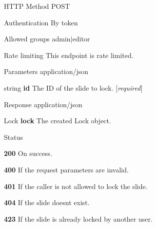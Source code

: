 \begin{DoxyParagraph}{H\+T\+TP Method}
P\+O\+ST 
\end{DoxyParagraph}
\begin{DoxyParagraph}{Authentication}
By token 
\end{DoxyParagraph}
\begin{DoxyParagraph}{Allowed groups}
{\ttfamily admin$\vert$editor} 
\end{DoxyParagraph}
\begin{DoxyParagraph}{Rate limiting}
This endpoint is rate limited.
\end{DoxyParagraph}
\begin{DoxyParagraph}{Parameters}
application/json
\begin{DoxyItemize}
\item {\ttfamily string} {\bfseries id} The ID of the slide to lock. \mbox{[}{\itshape required}\mbox{]}
\end{DoxyItemize}
\end{DoxyParagraph}
\begin{DoxyParagraph}{Response}
application/json
\begin{DoxyItemize}
\item {\ttfamily Lock} {\bfseries lock} The created Lock object.
\end{DoxyItemize}
\end{DoxyParagraph}
\begin{DoxyParagraph}{Status}

\begin{DoxyItemize}
\item {\bfseries 200} On success.
\item {\bfseries 400} If the request parameters are invalid.
\item {\bfseries 401} If the caller is not allowed to lock the slide.
\item {\bfseries 404} If the slide doesn\textquotesingle{}t exist.
\item {\bfseries 423} If the slide is already locked by another user. 
\end{DoxyItemize}
\end{DoxyParagraph}
